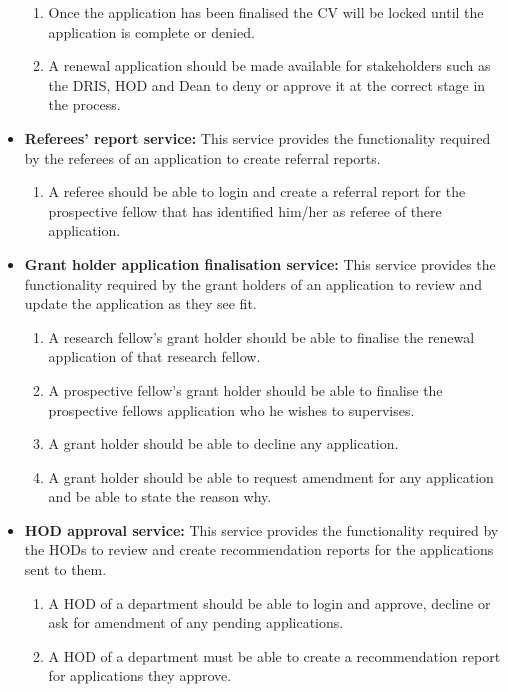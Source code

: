 \documentclass[12pt]{article}
\begin{document}
\begin{itemize}
\begin{enumerate}
			\item Once the application has been finalised the CV will be locked until the application is complete or denied.
			\item A renewal application should be made available for stakeholders such as the DRIS, HOD and Dean to deny or approve it at the correct stage in the process.							 					
		\end{enumerate}
		\item \textbf{Referees' report service:}
		This service provides the functionality required by the referees of an application to create referral reports.
		\begin{enumerate}		
			\item A referee should be able to login and create a referral report for the prospective fellow that has identified him/her as referee of there application.				 					
		\end{enumerate}
		\item \textbf{Grant holder application finalisation service:}
		This service provides the functionality required by the grant holders of an application to review and update the application as they see fit.
		\begin{enumerate}		
			\item A research fellow's grant holder should be able to finalise the renewal application of that research fellow.
			\item A prospective fellow's grant holder should be able to finalise the prospective fellows application who he wishes to  supervises.
			\item A grant holder should be able to decline any application.
			\item A grant holder should be able to request amendment for any application and be able to state the reason why.  				 					
		\end{enumerate}
		\item \textbf{HOD approval service:}
		This service provides the functionality required by the HODs to review and create recommendation reports for the applications sent to them.
		\begin{enumerate}		
			\item A HOD of a department should be able to login and approve, decline or ask for amendment of any pending applications.
			\item A HOD of a department must be able to create a recommendation report for applications they approve.				 					
		\end{enumerate}

\end{itemize}
\end{document}
